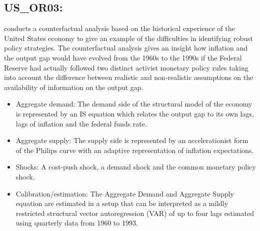 \documentclass[11pt,a4paper]{article}
\begin{document}
	
	\subsection{US\_OR03:\cite{Orphanides2003}}
	\label{USOR03}
	
	\cite{Orphanides2003} conducts a counterfactual analysis based on the historical experience of the United States economy to give an example of the difficulties in identifying robust policy strategies. The counterfactual analysis gives an insight how inflation and the output gap would have evolved from the 1960s to the 1990s if the Federal Reserve had actually followed two distinct activist monetary policy rules taking into account the difference between realistic and non-realistic assumptions on the availability of information on the output gap.
	\begin{itemize}
		\item Aggregate demand: The demand side of the structural model of the economy is represented by an IS equation which relates the output gap to its own lags, lags of inflation and the federal funds rate.
		\item Aggregate supply: The supply side is represented by an accelerationist form of the Philips curve with an adaptive representation of inflation expectations.
		\item Shocks: A cost-push shock, a demand shock and the common monetary policy shock.
		\item Calibration/estimation: The Aggregate Demand and Aggregate Supply equation are estimated in a setup that can be interpreted as a mildly restricted structural vector autoregression (VAR) of up to four lags estimated using quarterly data from 1960 to 1993.
	\end{itemize}
	
	
\end{document}
